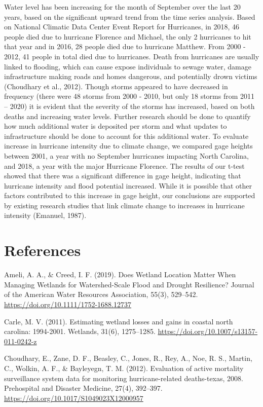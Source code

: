 \documentclass[12pt,]{article}
\begin{document}
Water level has been increasing for the month of September over the last
20 years, based on the significant upward trend from the time series
analysis. Based on National Climatic Data Center Event Report for
Hurricanes, in 2018, 46 people died due to hurricane Florence and
Michael, the only 2 hurricanes to hit that year and in 2016, 28 people
died due to hurricane Matthew. From 2000 - 2012, 41 people in total died
due to hurricanes. Death from hurricanes are usually linked to flooding,
which can cause expose individuals to sewage water, damage
infrastructure making roads and homes dangerous, and potentially drown
victims (Choudhary et al., 2012). Though storms appeared to have
decreased in frequency (there were 48 storms from 2000 - 2010, but only
18 storms from 2011 -- 2020) it is evident that the severity of the
storms has increased, based on both deaths and increasing water levels.
Further research should be done to quantify how much additional water is
deposited per storm and what updates to infrastructure should be done to
account for this additional water. To evaluate increase in hurricane
intensity due to climate change, we compared gage heights between 2001,
a year with no September hurricanes impacting North Carolina, and 2018,
a year with the major Hurricane Florence. The results of our t-test
showed that there was a significant difference in gage height,
indicating that hurricane intensity and flood potential increased. While
it is possible that other factors contributed to this increase in gage
height, our conclusions are supported by existing research studies that
link climate change to increases in hurricane intensity (Emanuel, 1987).

\newpage

\hypertarget{references}{%
\section{References}\label{references}}

Ameli, A. A., \& Creed, I. F. (2019). Does Wetland Location Matter When
Managing Wetlands for Watershed-Scale Flood and Drought Resilience?
Journal of the American Water Resources Association, 55(3), 529--542.
\url{https://doi.org/10.1111/1752-1688.12737}

Carle, M. V. (2011). Estimating wetland losses and gains in coastal
north carolina: 1994-2001. Wetlands, 31(6), 1275--1285.
\url{https://doi.org/10.1007/s13157-011-0242-z}

Choudhary, E., Zane, D. F., Beasley, C., Jones, R., Rey, A., Noe, R. S.,
Martin, C., Wolkin, A. F., \& Bayleyegn, T. M. (2012). Evaluation of
active mortality surveillance system data for monitoring
hurricane-related deaths-texas, 2008. Prehospital and Disaster Medicine,
27(4), 392--397. \url{https://doi.org/10.1017/S1049023X12000957}
\end{document}

